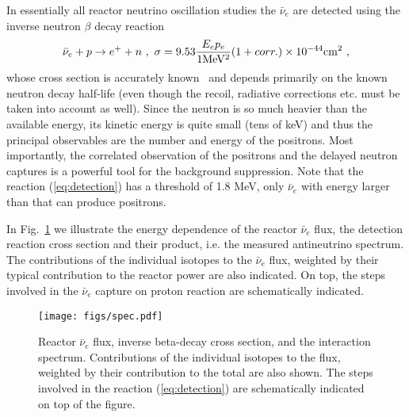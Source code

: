 In essentially all reactor neutrino oscillation studies the $\bar{\nu}_e$ are detected using the inverse neutron $\beta$ decay reaction
  \begin{equation}
  \bar{\nu}_e + p \rightarrow e^+ + n~, \\ ~ \sigma = 9.53 \frac{E_e p_e}{ 1  {\rm MeV^2}} (1 + corr.) \times 10^{-44} {\rm cm^2} ~,
  \label{eq:detection}
  \end{equation}
  whose cross section is accurately known~\cite{VB99, Strumia} and depends primarily on the known neutron decay half-life (even though the recoil, radiative
  corrections etc. must be taken into account as well). Since the neutron is so much heavier than the available energy, its kinetic energy is quite
  small (tens of keV) and thus the principal observables are the number and energy of the positrons. Most importantly, the correlated observation of the
  positrons and the delayed neutron captures is a powerful tool for the background suppression. Note that the reaction (\ref{eq:detection}) has
  a threshold of 1.8 MeV, only $\bar{\nu}_e$ with energy larger than that can produce positrons. 
  
  In Fig.~\ref{fig:spectra} we illustrate the energy dependence of the reactor $\bar{\nu}_e$ flux, the detection reaction cross section and their product,
  i.e. the measured antineutrino spectrum. The contributions of the individual isotopes to the $\bar{\nu}_e$ flux, weighted by their typical contribution
  to the reactor power are also indicated. On top, the steps involved in the $\bar{\nu}_e$ capture on proton reaction are schematically indicated. 
    

\begin{figure}[htb]
\begin{centering}
\texttt{[image: figs/spec.pdf]}
\par\end{centering}
\caption{\label{fig:spectra} Reactor $\bar{\nu}_e$ flux, inverse beta-decay cross section,
and the interaction spectrum. Contributions of the individual isotopes to the flux, weighted by their contribution to the total are also shown.
The steps involved in the reaction (\ref{eq:detection}) are schematically indicated on top of the figure.   }
\end{figure}
